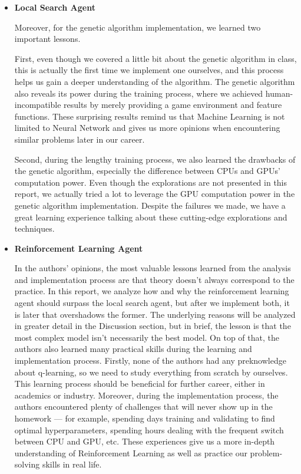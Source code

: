 \documentclass[letterpaper]{article} %
\begin{document}
\begin{itemize}
  \item \textbf{Local Search Agent}
  
Moreover, for the genetic algorithm implementation, we learned two important lessons. 
 
First, even though we covered a little bit about the genetic algorithm in class, this is actually the first time we implement one ourselves, and this process helps us gain a deeper understanding of the algorithm. The genetic algorithm also reveals its power during the training process, where we achieved human-incompatible results by merely providing a game environment and feature functions. These surprising results remind us that Machine Learning is not limited to Neural Network and gives us more opinions when encountering similar problems later in our career.

Second, during the lengthy training process, we also learned the drawbacks of the genetic algorithm, especially the difference between CPUs and GPUs' computation power. Even though the explorations are not presented in this report, we actually tried a lot to leverage the GPU computation power in the genetic algorithm implementation. Despite the failures we made, we have a great learning experience talking about these cutting-edge explorations and techniques.
  \item \textbf{Reinforcement Learning Agent}
  
  In the authors' opinions, the most valuable lessons learned from the analysis and implementation process are that theory doesn't always correspond to the practice. In this report, we analyze how and why the reinforcement learning agent should surpass the local search agent, but after we implement both, it is later that overshadows the former. The underlying reasons will be analyzed in greater detail in the Discussion section, but in brief, the lesson is that the most complex model isn't necessarily the best model. On top of that, the authors also learned many practical skills during the learning and implementation process. Firstly, none of the authors had any preknowledge about q-learning, so we need to study everything from scratch by ourselves. This learning process should be beneficial for further career, either in academics or industry. Moreover, during the implementation process, the authors encountered plenty of challenges that will never show up in the homework — for example, spending days training and validating to find optimal hyperparameters, spending hours dealing with the frequent switch between CPU and GPU, etc. These experiences give us a more in-depth understanding of Reinforcement Learning as well as practice our problem-solving skills in real life. 
\end{itemize}
\end{document}
